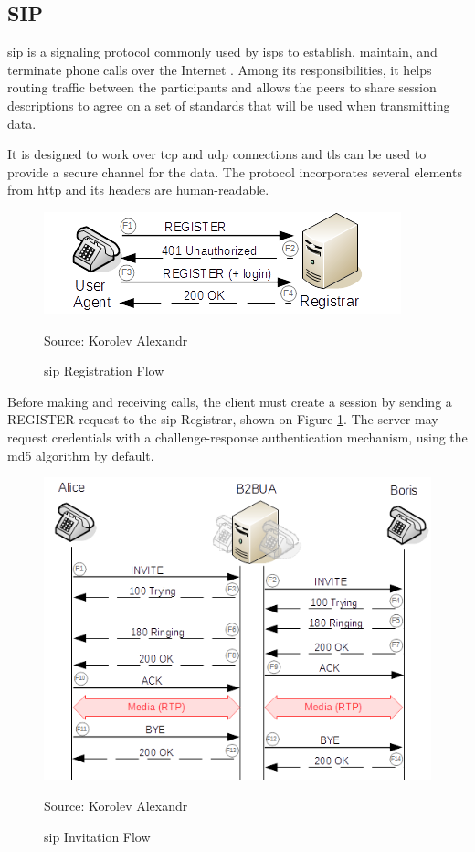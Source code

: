 \subsection{SIP}

\gls{sip} is a signaling protocol commonly used by \glspl{isp} to establish, maintain, and terminate phone calls over the Internet \cite{rfc3261}. Among its responsibilities, it helps routing traffic between the participants and allows the peers to share session descriptions to agree on a set of standards that will be used when transmitting data.

It is designed to work over \gls{tcp} and \gls{udp} connections and \gls{tls} can be used to provide a secure channel for the data. The protocol incorporates several elements from \gls{http} and its headers are human-readable.

\begin{figure}[h]
    \centering
    \includegraphics[width=\linewidth]{contents/background-in-isp-side-protocols/sip/sip-registration-flow.png}
    \caption{\gls{sip} Registration Flow}
    {Source: Korolev Alexandr}
    \label{figure:sip_register}
\end{figure}

Before making and receiving calls, the client must create a session by sending a REGISTER request to the \gls{sip} Registrar, shown on Figure \ref{figure:sip_register}. The server may request credentials with a challenge-response authentication mechanism, using the \gls{md5} algorithm \cite{rfc1321} by default.

\begin{figure}[h]
    \centering
    \includegraphics[width=\linewidth]{contents/background-in-isp-side-protocols/sip/sip-b2bua-call-flow.png}
    \caption{\gls{sip} Invitation Flow}
    {Source: Korolev Alexandr}
    \label{figure:sip_invite}
\end{figure}

